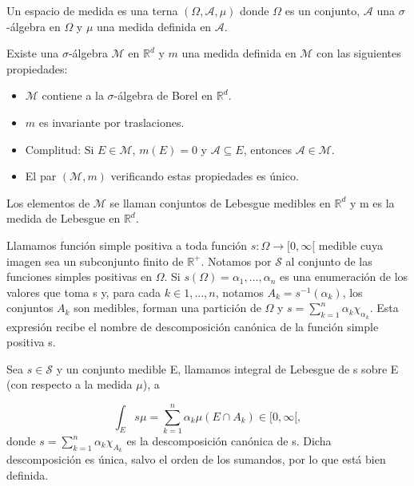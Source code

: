 \begin{definicion}
Un espacio de medida es una terna $(\Omega,\mathcal{A},\mu)$ donde $\Omega$ es un conjunto, $\mathcal{A}$ una $\sigma$-álgebra en $\Omega$ y $\mu$ una medida definida en $\mathcal{A}$. 
\end{definicion}

\begin{teorema}
Existe una $\sigma$-álgebra $\mathcal{M}$ en $\mathds{R}^{d}$ y $m$ una medida definida en $\mathcal{M}$ con las siguientes propiedades: 
\begin{itemize}
	\item $\mathcal{M}$ contiene a la $\sigma$-álgebra de Borel en $\mathds{R}^{d}$.
	\item $m$ es invariante por traslaciones.
	\item Complitud: Si $E\in\mathcal{M}$, $m(E)=0$ y $\mathcal{A}\subseteq E$, entonces $\mathcal{A}\in\mathcal{M}$.
	\item El par $(\mathcal{M},m)$ verificando estas propiedades es único.
\end{itemize}

Los elementos de $\mathcal{M}$ se llaman conjuntos de Lebesgue medibles en $\mathds{R}^{d}$ y m es la medida de Lebesgue en $\mathds{R}^{d}$. 
\end{teorema}

\begin{definicion}
Llamamos función simple positiva a toda función $s:\Omega\rightarrow[0,\infty[$ medible cuya imagen sea un subconjunto finito de $\mathds{R}^{+}$. Notamos por $\mathcal{S}$ al conjunto de las funciones simples positivas en $\Omega$. Si $s(\Omega) = { \alpha_{1},...,\alpha_{n} }$ es una enumeración de los valores que toma s y, para cada $k\in{1,...,n}$, notamos $A_{k}=s^{-1}({\alpha_{k}})$, los conjuntos $A_{k}$ son medibles, forman una partición de $\Omega$ y $s=\sum_{k=1}^{n}\alpha_{k}\chi_{\alpha_{k}}$. Esta expresión recibe el nombre de descomposición canónica de la función simple positiva s. 
\end{definicion}

\begin{definicion}

Sea $s\in \mathcal{S}$ y un conjunto medible E, llamamos integral de Lebesgue de s sobre E (con respecto a la medida $\mu$), a

$$\int_{E}s \mu = \sum_{k=1}^{n}\alpha_{k}\mu(E\cap A_{k}) \in [0,\infty[,$$
donde $s=\sum_{k=1}^{n} \alpha_{k}\chi_{A_{k}}$ es la descomposición canónica de s. Dicha descomposición es única, salvo el orden de los sumandos, por lo que está bien definida.

\end{definicion}
